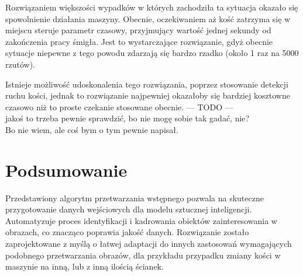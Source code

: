 Rozwiązaniem większości wypadków w których zachodziła ta sytuacja okazało się spowolnienie działania maszyny.
Obecnie, oczekiwaniem aż kość zatrzyma się w miejscu steruje parametr czasowy, przyjmujący wartość jednej sekundy od zakończenia pracy śmigła.
Jest to wystarczające rozwiązanie, gdyż obecnie sytuacje niepewne z tego powodu zdarzają się bardzo rzadko (około 1 raz na 5000 rzutów).

Istnieje możliwość udoskonalenia tego rozwiązania, poprzez stosowanie detekcji ruchu kości,
jednak to rozwiązanie najpewniej okazałoby się bardziej kosztowne czasowo niż to proste czekanie stosowane obecnie.
--- TODO --- \\
jakoś to trzeba pewnie sprawdzić, bo nie mogę sobie tak gadać, nie? \\
Bo nie wiem, ale coś bym o tym pewnie napisał.



\section{Podsumowanie}

Przedstawiony algorytm przetwarzania wstępnego pozwala na skuteczne przygotowanie danych wejściowych dla modelu sztucznej inteligencji.
Automatyzuje proces identyfikacji i kadrowania obiektów zainteresowania w obrazach, co znacząco poprawia jakość danych.
Rozwiązanie zostało zaprojektowane z myślą o łatwej adaptacji do innych zastosowań wymagających podobnego przetwarzania obrazów,
dla przykładu przypadku zmiany kości w maszynie na inną, lub z inną ilością ścianek.


